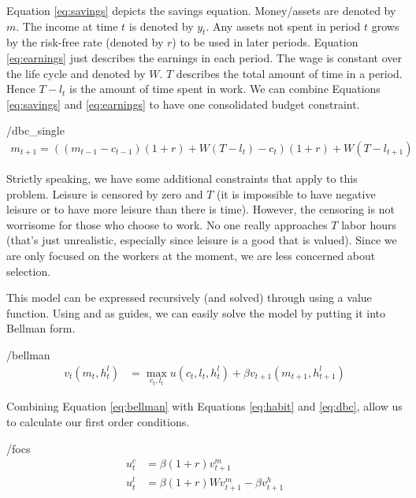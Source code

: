 \documentclass[ProjectMMD]{subfiles}
\begin{document}
Equation \eqref{eq:savings} depicts the savings equation. Money/assets are denoted by $m$. The income at time $t$ is denoted by $y_t$. Any assets not spent in period $t$ grows by the risk-free rate (denoted by $r$) to be used in later periods. Equation \eqref{eq:earnings} just describes the earnings in each period. The wage is constant over the life cycle and denoted by $W$. $T$ describes the total amount of time in a period. Hence $T-l_t$ is the amount of time spent in work. We can combine Equations \eqref{eq:savings} and \eqref{eq:earnings} to have one consolidated budget constraint.
\hypertarget{dbc_single}{}
\begin{verbatimwrite}{\EqDir/dbc_single}
  \begin{align}
    m_{t+1} = ((m_{t-1}-c_{t-1})(1+r) +W(T-l_t) - c_t ) (1+r) + W(T-l_{t+1}) \label{eq:dbc}
  \end{align}
\end{verbatimwrite}


Strictly speaking, we have some additional constraints that apply to this problem. Leisure is censored by zero and $T$ (it is impossible to have negative leisure or to have more leisure than there is time). However, the censoring is not worrisome for those who choose to work. No one really approaches $T$ labor hours (that's just unrealistic, especially since leisure is a good that is valued). Since we are only focused on the workers at the moment, we are less concerned about selection.  

This model can be expressed recursively (and solved) through using a value function. Using \cite{carroll:solvinghabits} and \cite{kubin2002labour} as guides, we can easily solve the model by putting it into Bellman form.

\hypertarget{bellman}{}
\begin{verbatimwrite}{\EqDir/bellman}
  \begin{align}
    v_t(m_t, h_t^l) &= \max _{c_t, l_t}u(c_t, l_t, h_t^l) + \beta v_{t+1}(m_{t+1}, h_{t+1}^l) \label{eq:bellman}
  \end{align}
\end{verbatimwrite}

Combining Equation \eqref{eq:bellman} with Equations \eqref{eq:habit} and \eqref{eq:dbc}, allow us to calculate our first order conditions.


\hypertarget{focs}{}
\begin{verbatimwrite}{\EqDir/focs}
  \begin{align}
    u^c_t &=\beta(1+r)v_{t+1}^m \label{eq:focc} \\
    u^l_t &= \beta(1+r)W v_{t+1}^m - \beta v_{t+1}^h \label{eq:focl}
  \end{align}
\end{verbatimwrite}

\end{document}

